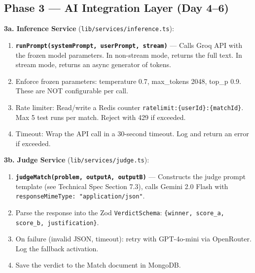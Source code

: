 \documentclass[11pt, a4paper]{article}
\begin{document}
\subsection{Phase 3 --- AI Integration Layer (Day 4--6)}

\begin{tcolorbox}[phasebox=infopurple, title={Goal: Working inference and judge pipeline}]

\textbf{3a. Inference Service} (\texttt{lib/services/inference.ts}):
\begin{enumerate}[leftmargin=1cm, itemsep=2pt]
    \item \textbf{\texttt{runPrompt(systemPrompt, userPrompt, stream)}} --- Calls Groq API with the frozen model parameters. In non-stream mode, returns the full text. In stream mode, returns an async generator of tokens.
    \item Enforce frozen parameters: temperature 0.7, max\_tokens 2048, top\_p 0.9. These are NOT configurable per call.
    \item Rate limiter: Read/write a Redis counter \texttt{ratelimit:\{userId\}:\{matchId\}}. Max 5 test runs per match. Reject with 429 if exceeded.
    \item Timeout: Wrap the API call in a 30-second timeout. Log and return an error if exceeded.
\end{enumerate}

\textbf{3b. Judge Service} (\texttt{lib/services/judge.ts}):
\begin{enumerate}[leftmargin=1cm, itemsep=2pt]
    \item \textbf{\texttt{judgeMatch(problem, outputA, outputB)}} --- Constructs the judge prompt template (see Technical Spec Section 7.3), calls Gemini 2.0 Flash with \texttt{responseMimeType: "application/json"}.
    \item Parse the response into the Zod \texttt{VerdictSchema}: \texttt{\{winner, score\_a, score\_b, justification\}}.
    \item On failure (invalid JSON, timeout): retry with GPT-4o-mini via OpenRouter. Log the fallback activation.
    \item Save the verdict to the Match document in MongoDB.
\end{enumerate}
\end{tcolorbox}
\end{document}
